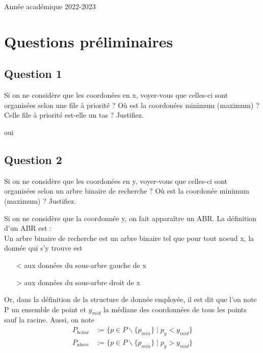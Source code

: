 \documentclass{article}
\begin{document}
\begin{titlepage}
\begin{center}
        {\large Année académique 2022-2023}
        
    \end{center}
\end{titlepage}

\newpage

\tableofcontents

\newpage

\section{Questions préliminaires}

\subsection{Question 1} Si on ne considère que les coordonées en x, voyer-vous
que celles-ci sont organisées selon une file à priorité ? Où est la coordonées minimum (maximum) ?
Celle file à priorité est-elle un tas ? Justifiez.

\bigskip

oui %

\subsection{Question 2} Si on ne considère que les coordonées en y, voyer-vous 
que celles-ci sont organisées selon un arbre binaire de recherche ? Où est la coordonée minimum (maximum) ? Justifiez.

\bigskip

Si on ne considère que la coordonnée y, on fait apparaître un ABR. La définition d'un ABR est : \\
Un arbre binaire de recherche est un arbre binaire tel que pour tout noeud x, la donnée qui s'y trouve est
\begin{itemize}
    \item[<] aux données du sous-arbre gauche de x
    \item[>] aux données du sous-arbre droit de x 
\end{itemize}
Or, dans la définition de la structure de donnée employée, il est dit que l'on note P un ensemble de point et $y_{mid}$ la médiane des coordonnées de tous
les points sauf la racine. Aussi, on note 
\begin{align}
    P_{below} &:= \{p \in P\backslash \{ p_{min} \} \mid p_y < y_{mid}\} \nonumber\\
    P_{above} &:= \{p \in P\backslash \{ p_{min} \} \mid p_y > y_{mid}\} \nonumber
\end{align}
\end{document}
